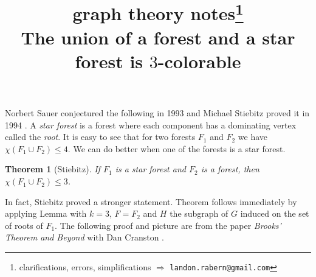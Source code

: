 \documentclass[12pt]{article}
\title{graph theory notes\thanks{clarifications, errors, simplifications $\Rightarrow$ \texttt{landon.rabern@gmail.com}}\\ \bigskip
The union of a forest and a star forest is $3$-colorable}
\date{}
\theoremstyle{plain}
\newtheorem*{Theorem}{Theorem}
\theoremstyle{definition}
\theoremstyle{remark}
\begin{document}
\maketitle
Norbert Sauer conjectured the following in 1993 \cite{sauer} and Michael Stiebitz proved it in 1994 \cite{stiebitz1994forest}.  A \emph{star forest} is a forest where each component has a dominating vertex called the \emph{root}.
It is easy to see that for two forests $F_1$ and $F_2$ we have $\chi(F_1 \cup F_2) \le 4$.  We can do better when one of the forests is a star forest.
\begin{Theorem}[Stiebitz]
If $F_1$ is a star forest and $F_2$ is a forest, then $\chi(F_1 \cup F_2) \le 3$.
\end{Theorem}

In fact, Stiebitz proved a stronger statement.  Theorem follows immediately by applying Lemma with $k=3$, $F = F_2$ and $H$ the subgraph of $G$ induced on the set of roots of $F_1$.  The following proof and picture are from the paper \emph{Brooks' Theorem and Beyond} with Dan Cranston \cite{brooksbeyond}.
\end{document}
